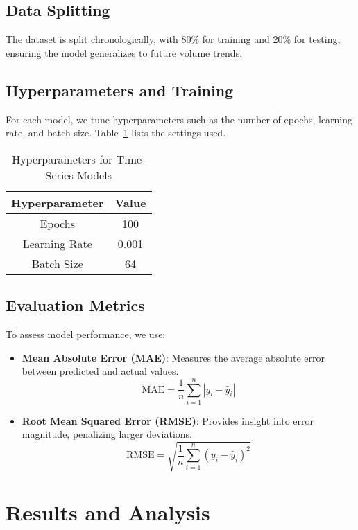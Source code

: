 \documentclass{article}
\begin{document}
\subsection{Data Splitting}
The dataset is split chronologically, with 80\% for training and 20\% for testing, ensuring the model generalizes to future volume trends.

\subsection{Hyperparameters and Training}
For each model, we tune hyperparameters such as the number of epochs, learning rate, and batch size. Table~\ref{tab:hyperparams} lists the settings used.
\begin{table}[h]
\centering
\begin{tabular}{|c|c|}
\hline
\textbf{Hyperparameter} & \textbf{Value} \\
\hline
Epochs & 100 \\
Learning Rate & 0.001 \\
Batch Size & 64 \\
\hline
\end{tabular}
\caption{Hyperparameters for Time-Series Models}
\label{tab:hyperparams}
\end{table}

\subsection{Evaluation Metrics}
To assess model performance, we use:
\begin{itemize}
    \item \textbf{Mean Absolute Error (MAE)}: Measures the average absolute error between predicted and actual values.
    \begin{equation}
        \text{MAE} = \frac{1}{n} \sum_{i=1}^{n} |y_i - \hat{y}_i|
    \end{equation}
    \item \textbf{Root Mean Squared Error (RMSE)}: Provides insight into error magnitude, penalizing larger deviations.
    \begin{equation}
        \text{RMSE} = \sqrt{\frac{1}{n} \sum_{i=1}^{n} (y_i - \hat{y}_i)^2}
    \end{equation}
\end{itemize}

\section{Results and Analysis}
\end{document}
